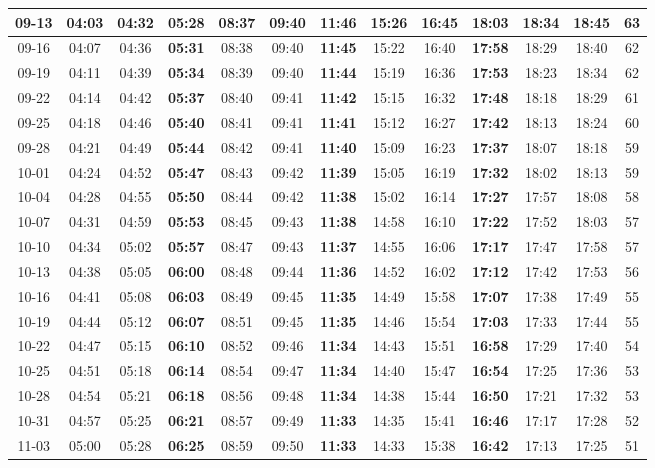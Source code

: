 \begin{footnotesize}
\begin{longtable}{c | c | c | c | c | c | c | c | c | c | c | c | c}
		09-13&04:03&04:32&\textbf{05:28}&08:37&09:40&\textbf{11:46}&15:26&16:45&\textbf{18:03}&18:34&18:45&63\\\hline
		09-16&04:07&04:36&\textbf{05:31}&08:38&09:40&\textbf{11:45}&15:22&16:40&\textbf{17:58}&18:29&18:40&62\\\hline
		09-19&04:11&04:39&\textbf{05:34}&08:39&09:40&\textbf{11:44}&15:19&16:36&\textbf{17:53}&18:23&18:34&62\\\hline
		09-22&04:14&04:42&\textbf{05:37}&08:40&09:41&\textbf{11:42}&15:15&16:32&\textbf{17:48}&18:18&18:29&61\\\hline
		09-25&04:18&04:46&\textbf{05:40}&08:41&09:41&\textbf{11:41}&15:12&16:27&\textbf{17:42}&18:13&18:24&60\\\hline
		09-28&04:21&04:49&\textbf{05:44}&08:42&09:41&\textbf{11:40}&15:09&16:23&\textbf{17:37}&18:07&18:18&59\\\hline
		10-01&04:24&04:52&\textbf{05:47}&08:43&09:42&\textbf{11:39}&15:05&16:19&\textbf{17:32}&18:02&18:13&59\\\hline
		10-04&04:28&04:55&\textbf{05:50}&08:44&09:42&\textbf{11:38}&15:02&16:14&\textbf{17:27}&17:57&18:08&58\\\hline
		10-07&04:31&04:59&\textbf{05:53}&08:45&09:43&\textbf{11:38}&14:58&16:10&\textbf{17:22}&17:52&18:03&57\\\hline
		10-10&04:34&05:02&\textbf{05:57}&08:47&09:43&\textbf{11:37}&14:55&16:06&\textbf{17:17}&17:47&17:58&57\\\hline
		10-13&04:38&05:05&\textbf{06:00}&08:48&09:44&\textbf{11:36}&14:52&16:02&\textbf{17:12}&17:42&17:53&56\\\hline
		10-16&04:41&05:08&\textbf{06:03}&08:49&09:45&\textbf{11:35}&14:49&15:58&\textbf{17:07}&17:38&17:49&55\\\hline
		10-19&04:44&05:12&\textbf{06:07}&08:51&09:45&\textbf{11:35}&14:46&15:54&\textbf{17:03}&17:33&17:44&55\\\hline
		10-22&04:47&05:15&\textbf{06:10}&08:52&09:46&\textbf{11:34}&14:43&15:51&\textbf{16:58}&17:29&17:40&54\\\hline
		10-25&04:51&05:18&\textbf{06:14}&08:54&09:47&\textbf{11:34}&14:40&15:47&\textbf{16:54}&17:25&17:36&53\\\hline
		10-28&04:54&05:21&\textbf{06:18}&08:56&09:48&\textbf{11:34}&14:38&15:44&\textbf{16:50}&17:21&17:32&53\\\hline
		10-31&04:57&05:25&\textbf{06:21}&08:57&09:49&\textbf{11:33}&14:35&15:41&\textbf{16:46}&17:17&17:28&52\\\hline
		11-03&05:00&05:28&\textbf{06:25}&08:59&09:50&\textbf{11:33}&14:33&15:38&\textbf{16:42}&17:13&17:25&51\\\hline

\end{longtable}
\end{footnotesize}
